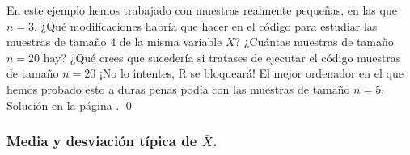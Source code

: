 \documentclass[10pt,a4paper]{article}\usepackage[]{graphicx}\usepackage[]{color}
\begin{document}
\begin{ejercicio}
\label{tut06:ejercicio02}
En este ejemplo hemos trabajado con muestras realmente pequeñas, en las que $n=3$. ¿Qué modificaciones habría que hacer en el código para estudiar las muestras de tamaño $4$ de la misma variable $X$? ¿Cuántas muestras de tamaño $n=20$ hay? ¿Qué crees que sucedería si tratases de ejecutar el código muestras de tamaño $n=20$ ¡No lo intentes, R se bloqueará! El mejor ordenador en el que hemos probado esto a duras penas podía con las muestras de tamaño $n=5$. Solución en la página \pageref{tut06:ejercicio02:sol}.
\qed
\end{ejercicio}

\subsubsection*{Media y desviación típica de $\bar X$.}
\end{document}
